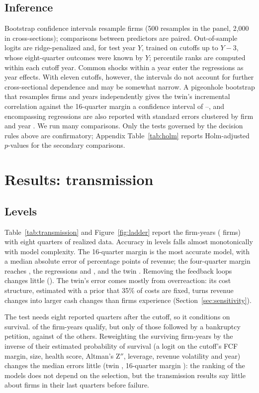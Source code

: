 \documentclass[11pt]{article}
\begin{document}
\subsection{Inference}
Bootstrap confidence intervals resample firms (500 resamples in the panel, 2{,}000 in cross-sections); comparisons between predictors are paired. Out-of-sample logits are ridge-penalized and, for test year $Y$, trained on cutoffs up to $Y-3$, whose eight-quarter outcomes were known by $Y$; percentile ranks are computed within each cutoff year. Common shocks within a year enter the regressions as year effects. With eleven cutoffs, however, the intervals do not account for further cross-sectional dependence and may be somewhat narrow. A pigeonhole bootstrap that resamples firms and years independently gives the twin's incremental correlation against the 16-quarter margin a confidence interval of \TwoWayLo--\TwoWayHi, and encompassing regressions are also reported with standard errors clustered by firm and year \citep{cameron2008}. We run many comparisons. Only the tests governed by the decision rules above are confirmatory; Appendix Table~\ref{tab:holm} reports Holm-adjusted $p$-values for the secondary comparisons.

\section{Results: transmission}\label{sec:transmission}

\subsection{Levels}
Table~\ref{tab:transmission} and Figure~\ref{fig:ladder} report the \TrN{} firm-years (\TrFirms{} firms) with eight quarters of realized data. Accuracy in levels falls almost monotonically with model complexity. The 16-quarter margin is the most accurate model, with a median absolute error of \TrMaeNthree{} percentage points of revenue; the four-quarter margin reaches \TrMaeNone, the regressions \TrMaeNfive{} and \TrMaeNsix, and the twin \TrMaeTone. Removing the feedback loops changes little (\TrMaeTzero). The twin's error comes mostly from overreaction: its cost structure, estimated with a prior that 35\% of costs are fixed, turns revenue changes into larger cash changes than firms experience (Section~\ref{sec:sensitivity}).

The test needs eight reported quarters after the cutoff, so it conditions on survival. \AttrShare{} of the firm-years qualify, but only \AttrShareBk{} of those followed by a bankruptcy petition, against \AttrShareNonBk{} of the others. Reweighting the surviving firm-years by the inverse of their estimated probability of survival (a logit on the cutoff's FCF margin, size, health score, Altman's Z$''$, leverage, revenue volatility and year) changes the median errors little (twin \AttrTwinIpw, 16-quarter margin \AttrSixteenIpw): the ranking of the models does not depend on the selection, but the transmission results say little about firms in their last quarters before failure.
\end{document}
